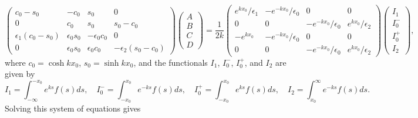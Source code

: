 \documentclass{aastex61}
\begin{document}
\begin{equation}
\left(
\begin{matrix}
c_0-s_0              &-c_0           &s_0              &0                   \\
0                    &c_0            &s_0              &s_0-c_0           \\
\epsilon_1(c_0-s_0)  &\epsilon_0s_0  &-\epsilon_0c_0   &0                   \\
0                    &\epsilon_0s_0  &\epsilon_0c_0    &-\epsilon_2(s_0-c_0)
\end{matrix}
\right)
\left(
\begin{matrix}
A \\
B \\
C \\
D
\end{matrix}
\right)
=
\frac{1}{2k}
\left(
\begin{matrix}
e^{kx_0}/\epsilon_1  & -e^{-kx_0}/\epsilon_0  & 0                      & 0                   \\
0                    & 0                      & -e^{-kx_0}/\epsilon_0  & e^{kx_0}/\epsilon_2 \\
-e^{kx_0}            & -e^{-kx_0}/\epsilon_0  & 0                      & 0                   \\
0                    & 0                      & -e^{-kx_0}/\epsilon_0  & e^{kx_0}/\epsilon_2
\end{matrix}
\right)
\left(
\begin{matrix}
I_1    \\
I_0^- \\
I_0^+ \\
I_2
\end{matrix}
\right),
\label{coefmatrix}
\end{equation}
where $c_0 = \cosh{kx_0}$, $s_0 = \sinh{kx_0}$, and the functionals $I_1$, $I_0^-$, $I_0^+$, and $I_2$ are given by
\begin{equation}
I_1 = \int_{-\infty}^{-x_0} e^{ks}f(s) ds, \quad I_0^- = \int_{-x_0}^{x_0} e^{-ks}f(s) ds, \quad I_0^+ = \int_{-x_0}^{x_0} e^{ks}f(s) ds, \quad I_2  = \int_{x_0}^{\infty} e^{-ks}f(s) ds.
\end{equation}
Solving this system of equations gives
\newcommand{\e}{\epsilon}
\end{document}
